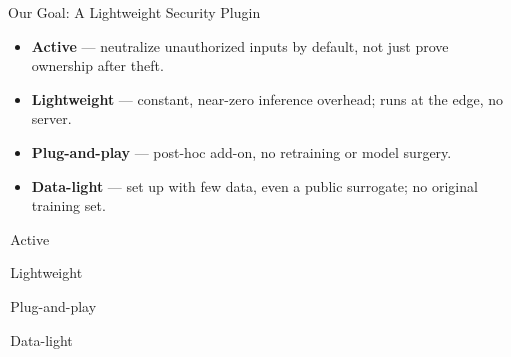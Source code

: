 \documentclass{beamer}
\newcommand{\pilltag}[1]{\colorbox{structure!12}{\scriptsize\strut\,#1\,}}
\begin{document}
\begin{frame}{Our Goal: A Lightweight Security Plugin}

    \begin{itemize}
        \setlength\itemsep{0.18cm}
        \item \textbf{Active} --- neutralize unauthorized inputs by default, not just prove ownership after theft.
        \item \textbf{Lightweight} --- constant, near-zero inference overhead; runs at the edge, no server.
        \item \textbf{Plug-and-play} --- post-hoc add-on, no retraining or model surgery.
        \item \textbf{Data-light} --- set up with few data, even a public surrogate; no original training set.
    \end{itemize}
    \vspace{0.35cm}
    \begin{center}
        \pilltag{Active} \pilltag{Lightweight} \pilltag{Plug-and-play} \pilltag{Data-light}
    \end{center}
\end{frame}
\end{document}
